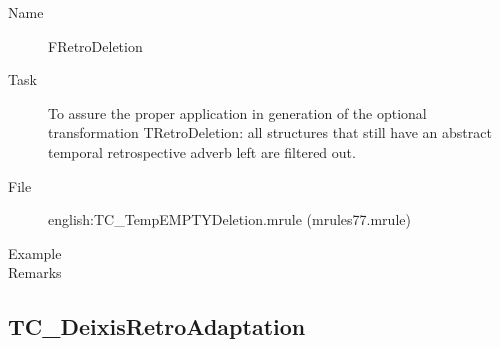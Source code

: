 \begin{description}
\vspace{1 cm}
\begin{description}
\item[Name] FRetroDeletion
\item[Task] To assure the proper application in generation of the optional 
transformation TRetroDeletion: all structures that still have an abstract 
temporal retrospective adverb left are filtered out.
\item[File] english:TC\_TempEMPTYDeletion.mrule (mrules77.mrule)
\item[Example] 
\item[Remarks]
\end{description}

\end{description}

\newpage
\subsection{TC\_DeixisRetroAdaptation}
